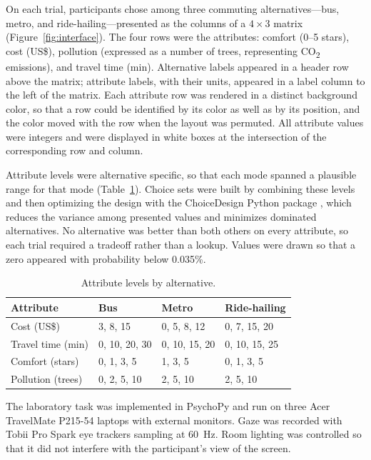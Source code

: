 \documentclass[man,natbib,floatsintext]{apa7}
\begin{document}
On each trial, participants chose among three commuting alternatives---bus, metro, and ride-hailing---presented as the columns of a $4 \times 3$ matrix (Figure~\ref{fig:interface}). The four rows were the attributes: comfort (0--5 stars), cost (US\$), pollution (expressed as a number of trees, representing CO\textsubscript{2} emissions), and travel time (min). Alternative labels appeared in a header row above the matrix; attribute labels, with their units, appeared in a label column to the left of the matrix. Each attribute row was rendered in a distinct background color, so that a row could be identified by its color as well as by its position, and the color moved with the row when the layout was permuted. All attribute values were integers and were displayed in white boxes at the intersection of the corresponding row and column.

Attribute levels were alternative specific, so that each mode spanned a plausible range for that mode (Table~\ref{tab:levels}). Choice sets were built by combining these levels and then optimizing the design with the ChoiceDesign Python package \citep{ignacio2020choicedesign}, which reduces the variance among presented values and minimizes dominated alternatives. No alternative was better than both others on every attribute, so each trial required a tradeoff rather than a lookup. Values were drawn so that a zero appeared with probability below 0.035\%.

\begin{table}[H]
\centering
\caption{Attribute levels by alternative.}
\label{tab:levels}
\begin{tabular}{llll}
\toprule
Attribute & Bus & Metro & Ride-hailing \\
\midrule
Cost (US\$) & 3, 8, 15 & 0, 5, 8, 12 & 0, 7, 15, 20 \\
Travel time (min) & 0, 10, 20, 30 & 0, 10, 15, 20 & 0, 10, 15, 25 \\
Comfort (stars) & 0, 1, 3, 5 & 1, 3, 5 & 0, 1, 3, 5 \\
Pollution (trees) & 0, 2, 5, 10 & 2, 5, 10 & 2, 5, 10 \\
\bottomrule
\end{tabular}
\end{table}

The laboratory task was implemented in PsychoPy and run on three Acer TravelMate P215-54 laptops with external monitors. Gaze was recorded with Tobii Pro Spark eye trackers sampling at 60~Hz. Room lighting was controlled so that it did not interfere with the participant's view of the screen.
\end{document}
